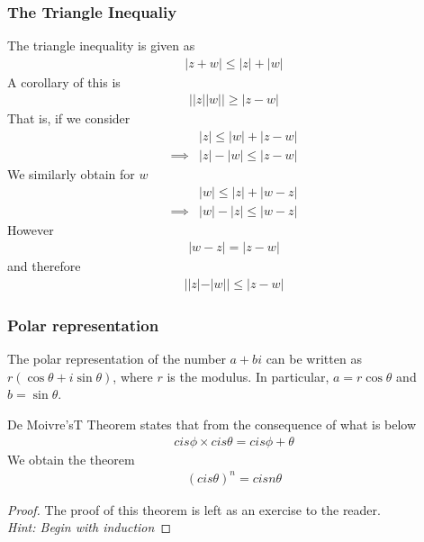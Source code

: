 \documentclass[a4paper]{article}
\theoremstyle{plain}
\newtheorem{thm}{Theorem}[section]
\theoremstyle{definition}
\theoremstyle{remark}
\begin{document}
\subsubsection{The Triangle Inequaliy}
The triangle inequality is given as
\begin{align*}
	|z+w| \le  |z| + |w|
\end{align*}
A corollary of this is
\begin{align*}
	||z|  |w|| \ge |z-w|
\end{align*}
That is, if we consider
\begin{align*}
	&|z|\le |w| + |z-w| \\
	\implies& |z| - |w| \le  |z-w| 
\end{align*}
We similarly obtain for $w$ 
\begin{align*}
	&|w| \le |z| + |w-z| \\
	\implies& |w| - |z| \le |w-z|
\end{align*}
However
\begin{align*}
	|w-z| = |z-w|
\end{align*}
and therefore
\begin{align*}
	||z| - |w|| \le  |z - w|
\end{align*}
\subsubsection{Polar representation}
The polar representation of the number $a+bi$ can be written as $r(\cos\theta + i\sin \theta)$, where $r$ is the modulus. In particular, $a=r \cos \theta$ and $b = \sin \theta$. 
\begin{tcolorbox}[colback=black!3!white,colframe=black!60!white,title=\begin{thm}De Moivre's Theorem \label{De Moivre's Theorem}\end{thm}]
	De Moivre'sT Theorem states that from the consequence of what is below
		\begin{align}
		cis \phi \times cis \theta = cis \phi + \theta
		\end{align}
	We obtain the theorem
	\begin{align}
		(	cis \theta )^{n} = cis n \theta
	\end{align}
	\begin{proof}
		The proof of this theorem is left as an exercise to the reader. \\
		\textit{Hint: Begin with induction}
	\end{proof}
\end{tcolorbox}
\end{document}
